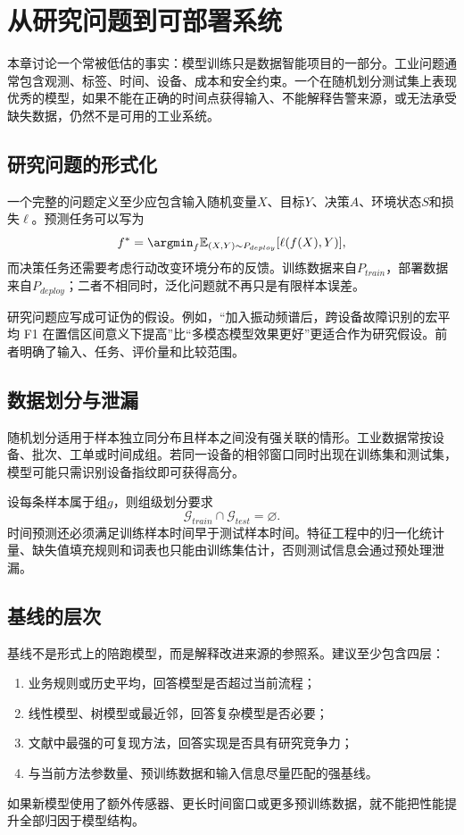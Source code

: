 \chapter{从研究问题到可部署系统}

本章讨论一个常被低估的事实：模型训练只是数据智能项目的一部分。工业问题通常包含观测、标签、时间、设备、成本和安全约束。一个在随机划分测试集上表现优秀的模型，如果不能在正确的时间点获得输入、不能解释告警来源，或无法承受缺失数据，仍然不是可用的工业系统。

\section{研究问题的形式化}
一个完整的问题定义至少应包含输入随机变量$X$、目标$Y$、决策$A$、环境状态$S$和损失$\ell$。预测任务可以写为
\begin{equation}
 f^*=\argmin_f\mathbb{E}_{(X,Y)\sim P_{deploy}}[\ell(f(X),Y)],
\end{equation}
而决策任务还需要考虑行动改变环境分布的反馈。训练数据来自$P_{train}$，部署数据来自$P_{deploy}$；二者不相同时，泛化问题就不再只是有限样本误差。

研究问题应写成可证伪的假设。例如，“加入振动频谱后，跨设备故障识别的宏平均 F1 在置信区间意义下提高”比“多模态模型效果更好”更适合作为研究假设。前者明确了输入、任务、评价量和比较范围。

\section{数据划分与泄漏}
随机划分适用于样本独立同分布且样本之间没有强关联的情形。工业数据常按设备、批次、工单或时间成组。若同一设备的相邻窗口同时出现在训练集和测试集，模型可能只需识别设备指纹即可获得高分。

设每条样本属于组$g$，则组级划分要求
\begin{equation}
 \mathcal{G}_{train}\cap\mathcal{G}_{test}=\varnothing.
\end{equation}
时间预测还必须满足训练样本时间早于测试样本时间。特征工程中的归一化统计量、缺失值填充规则和词表也只能由训练集估计，否则测试信息会通过预处理泄漏。

\section{基线的层次}
基线不是形式上的陪跑模型，而是解释改进来源的参照系。建议至少包含四层：
\begin{enumerate}[label=\arabic*.]
 \item 业务规则或历史平均，回答模型是否超过当前流程；
 \item 线性模型、树模型或最近邻，回答复杂模型是否必要；
 \item 文献中最强的可复现方法，回答实现是否具有研究竞争力；
 \item 与当前方法参数量、预训练数据和输入信息尽量匹配的强基线。
\end{enumerate}
如果新模型使用了额外传感器、更长时间窗口或更多预训练数据，就不能把性能提升全部归因于模型结构。

